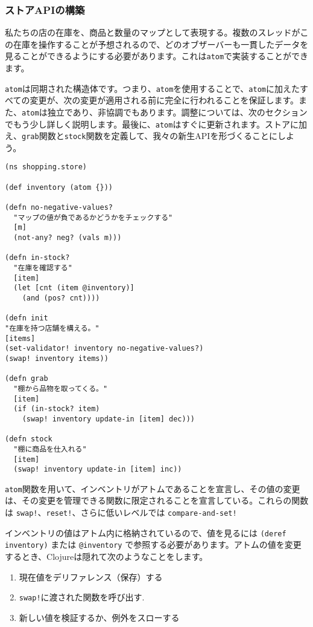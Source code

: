 \subsubsection{ストアAPIの構築}

私たちの店の在庫を、商品と数量のマップとして表現する。複数のスレッドがこの在庫を操作することが予想されるので、どのオブザーバーも一貫したデータを見ることができるようにする必要があります。これは\texttt{atom}で実装することができます。

\texttt{atom}は同期された構造体です。つまり、\texttt{atom}を使用することで、\texttt{atom}に加えたすべての変更が、次の変更が適用される前に完全に行われることを保証します。また、\texttt{atom}は独立であり、非協調でもあります。調整については、次のセクションでもう少し詳しく説明します。最後に、\texttt{atom}はすぐに更新されます。ストアに加え、\texttt{grab}関数と\texttt{stock}関数を定義して、我々の新生APIを形づくることにしよう。


\begin{lstlisting}[numbers=none]
(ns shopping.store)

(def inventory (atom {}))

(defn no-negative-values?
  "マップの値が負であるかどうかをチェックする"
  [m]
  (not-any? neg? (vals m)))

(defn in-stock?
  "在庫を確認する"
  [item]
  (let [cnt (item @inventory)]
    (and (pos? cnt))))

(defn init
"在庫を持つ店舗を構える。"
[items]
(set-validator! inventory no-negative-values?)
(swap! inventory items))

(defn grab
  "棚から品物を取ってくる。"
  [item]
  (if (in-stock? item)
    (swap! inventory update-in [item] dec)))

(defn stock
  "棚に商品を仕入れる"
  [item]
  (swap! inventory update-in [item] inc))
\end{lstlisting}

\texttt{atom}関数を用いて、インベントリがアトムであることを宣言し、その値の変更は、その変更を管理できる関数に限定されることを宣言している。これらの関数は \texttt{swap!}、\texttt{reset!}、さらに低いレベルでは \texttt{compare-and-set!}

インベントリの値はアトム内に格納されているので、値を見るには \texttt{(deref inventory)} または \texttt{@inventory} で参照する必要があります。アトムの値を変更するとき、Clojureは隠れて次のようなことをします。


\begin{enumerate}
\item 現在値をデリファレンス（保存）する
\item \texttt{swap!}に渡された関数を呼び出す.
\item 新しい値を検証するか、例外をスローする
\end{enumerate}

